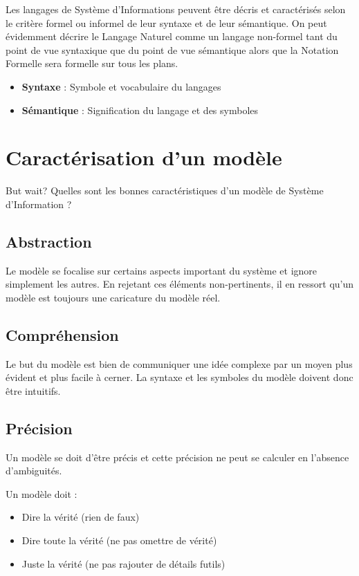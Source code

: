 Les langages de Système d'Informations peuvent être décris et caractérisés selon le critère formel ou informel de leur syntaxe et de leur sémantique. On peut évidemment décrire le Langage Naturel comme un langage non-formel tant du point de vue syntaxique que du point de vue sémantique alors que la Notation Formelle sera formelle sur tous les plans.

\begin{itemize}
  \item \textbf{Syntaxe} : Symbole et vocabulaire du langages
  \item \textbf{Sémantique} : Signification du langage et des symboles
\end{itemize}

\section{Caractérisation d'un modèle}

But wait? Quelles sont les bonnes caractéristiques d'un modèle de Système d'Information ?

\subsection{Abstraction}

Le modèle se focalise sur certains aspects important du système et ignore simplement les autres. En rejetant ces éléments non-pertinents, il en ressort qu'un modèle est toujours une caricature du modèle réel.

\subsection{Compréhension}

Le but du modèle est bien de communiquer une idée complexe par un moyen plus évident et plus facile à cerner. La syntaxe et les symboles du modèle doivent donc être intuitifs.

\subsection{Précision}

Un modèle se doit d'être précis et cette précision ne peut se calculer en l'absence d'ambiguités.

Un modèle doit :

\begin{itemize}
  \item Dire la vérité (rien de faux)
  \item Dire toute la vérité (ne pas omettre de vérité)
  \item Juste la vérité (ne pas rajouter de détails futils)
\end{itemize}

